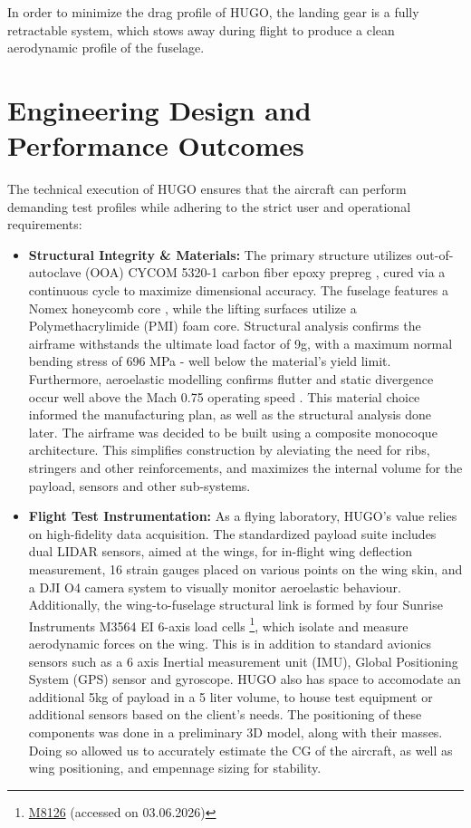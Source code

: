 In order to minimize the drag profile of HUGO, the landing gear is a fully retractable system, which stows away during flight to produce a clean aerodynamic profile of the fuselage.

\section*{Engineering Design and Performance Outcomes}
\label{sec:exec-eperformance_outcomes}

The technical execution of HUGO ensures that the aircraft can perform demanding test profiles while adhering to the strict user and operational requirements:

\begin{itemize}
    \item \textbf{Structural Integrity \& Materials:} The primary structure utilizes out-of-autoclave (OOA) CYCOM 5320-1 carbon fiber epoxy prepreg \cite{CENTEA2015132}, cured via a continuous cycle to maximize dimensional accuracy. The fuselage features a Nomex honeycomb core \cite{Boukharouba2014}, while the lifting surfaces utilize a Polymethacrylimide (PMI) foam core. Structural analysis confirms the airframe withstands the ultimate load factor of 9g, with a maximum normal bending stress of 696 MPa - well below the material's yield limit. Furthermore, aeroelastic modelling confirms flutter and static divergence occur well above the Mach 0.75 operating speed \cite{wright2008introduction}. This material choice informed the manufacturing plan, as well as the structural analysis done later. The airframe was decided to be built using a composite monocoque architecture. This simplifies construction by aleviating the need for ribs, stringers and other reinforcements, and maximizes the internal volume for the payload, sensors and other sub-systems.
    \item \textbf{Flight Test Instrumentation:} As a flying laboratory, HUGO's value relies on high-fidelity data acquisition. The standardized payload suite includes dual LIDAR sensors, aimed at the wings, for in-flight wing deflection measurement, 16 strain gauges placed on various points on the wing skin, and a DJI O4 camera system to visually monitor aeroelastic behaviour. Additionally, the wing-to-fuselage structural link is formed by four Sunrise Instruments M3564 EI 6-axis load cells \footnote{\href{https://www.srisensor.com/uploads/M8126-Users-Manual-V1.4-Eng11.pdf}{M8126} (accessed on 03.06.2026)}, which isolate and measure aerodynamic forces on the wing. This is in addition to standard avionics sensors such as a 6 axis Inertial measurement unit (IMU), Global Positioning System (GPS) sensor and gyroscope. HUGO also has space to accomodate an additional 5kg of payload in a 5 liter volume, to house test equipment or additional sensors based on the client's needs. The positioning of these components was done in a preliminary 3D model, along with their masses. Doing so allowed us to accurately estimate the CG of the aircraft, as well as wing positioning, and empennage sizing for stability.

\end{itemize}
